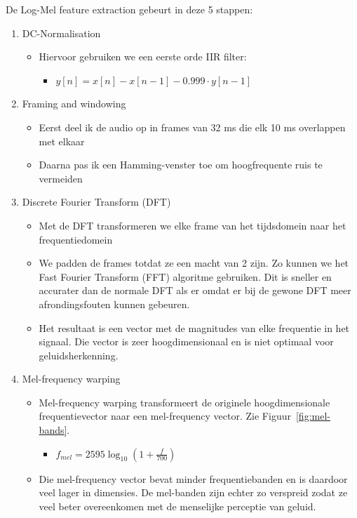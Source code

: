 \begin{no-awa} %
De  Log-Mel feature extraction gebeurt in deze 5 stappen:

\begin{enumerate}
	\item DC-Normalisation
	      \begin{itemize}
		      \item Hiervoor gebruiken we een eerste orde IIR filter:
		            \begin{itemize}[label={}]
			            \item \(y\left[ n \right] = x\left[ n \right] - x\left[ n - 1 \right] -0.999 \cdot y\left[ n - 1 \right]\)
		            \end{itemize}
	      \end{itemize}

	\item Framing and windowing
	      \begin{itemize}
		      \item Eerst deel ik de audio op in frames van 32 ms die elk 10 ms overlappen met elkaar
		      \item Daarna pas ik een Hamming-venster toe om hoogfrequente ruis te vermeiden \cite{enwiki:windowing}
	      \end{itemize}

	\item Discrete Fourier Transform (DFT)
	      \begin{itemize}
		      \item Met de DFT transformeren we elke frame van het tijdsdomein naar het frequentiedomein
		      \item We padden de frames totdat ze een macht van 2 zijn. Zo kunnen we het Fast Fourier Transform (FFT) algoritme gebruiken. Dit is sneller en accurater dan de normale DFT als er omdat er bij de gewone DFT meer afrondingsfouten kunnen gebeuren. \cite{enwiki:FFT}
		      \item Het resultaat is een vector met de magnitudes van elke frequentie in het signaal. Die vector is zeer hoogdimensionaal en is niet optimaal voor geluidsherkenning.
	      \end{itemize}

	\item Mel-frequency warping
	      \begin{itemize}
		      \item Mel-frequency warping transformeert de originele hoogdimensionale frequentievector naar een mel-frequency vector. Zie Figuur~\ref{fig:mel-bands}.
		            \begin{itemize}[label={}]
			            \item \(f_{mel} = 2595\log_{10}(1 + \frac{f}{700})\)
		            \end{itemize}
		      \item Die mel-frequency vector bevat minder frequentiebanden en is daardoor veel lager in dimensies. De mel-banden zijn echter zo verspreid zodat ze veel beter overeenkomen met de menselijke perceptie van geluid.
	      \end{itemize}


\end{enumerate}
\end{no-awa}
